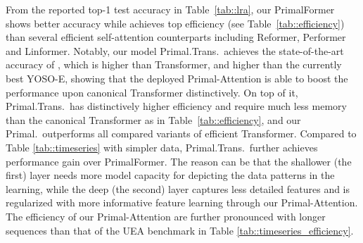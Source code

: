 \documentclass{article}
\begin{document}
From the reported top-1 test accuracy in Table~\ref{tab::lra}, our PrimalFormer shows better accuracy while achieves top efficiency (see Table~\ref{tab::efficiency}) than several efficient self-attention counterparts including Reformer, Performer and Linformer.
Notably, our model Primal.Trans.~achieves the state-of-the-art accuracy of , which is  higher than Transformer, and  higher than the currently best YOSO-E, showing that the deployed Primal-Attention is able to boost the performance upon canonical Transformer distinctively. 
On top of it, Primal.Trans.~has distinctively higher efficiency and require much less memory than the canonical Transformer as in Table~\ref{tab::efficiency}, {and our Primal.~outperforms all compared variants of efficient Transformer.} 
Compared to Table \ref{tab::timeseries} with simpler data, Primal.Trans.~further achieves performance gain over PrimalFormer. 
The reason can be that the shallower (the first) layer needs more model capacity for depicting the data patterns in the learning, while the deep (the second) layer captures less detailed features and is regularized with more informative feature learning through our Primal-Attention.  
{The efficiency of our Primal-Attention are further pronounced with longer sequences than that of the UEA benchmark in Table \ref{tab::timeseries_efficiency}.}
\end{document}
